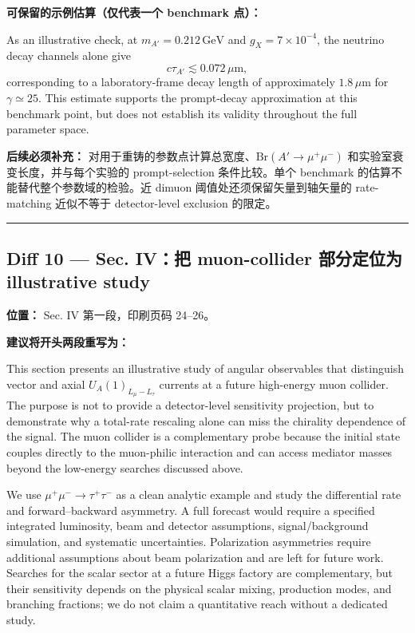 \documentclass[
]{article}
\begin{document}
\textbf{可保留的示例估算（仅代表一个 benchmark 点）：}

As an illustrative check, at \(m_{A'}=0.212\,\mathrm{GeV}\) and
\(g_X=7\times10^{-4}\), the neutrino decay channels alone give
\[
c\tau_{A'}\lesssim 0.072\,\mu\mathrm{m},
\]
corresponding to a laboratory-frame decay length of approximately
\(1.8\,\mu\mathrm{m}\) for \(\gamma\simeq25\). This estimate supports
the prompt-decay approximation at this benchmark point, but does not
establish its validity throughout the full parameter space.

\textbf{后续必须补充：}
对用于重铸的参数点计算总宽度、\(\mathrm{Br}(A'\to\mu^+\mu^-)\)
和实验室衰变长度，并与每个实验的 prompt-selection 条件比较。单个
benchmark 的估算不能替代整个参数域的检验。近 dimuon
阈值处还须保留矢量到轴矢量的 rate-matching 近似不等于 detector-level
exclusion 的限定。

\begin{center}\rule{0.5\linewidth}{0.5pt}\end{center}

\subsection{Diff 10 --- Sec. IV：把 muon-collider 部分定位为
illustrative
study}\label{diff-10-sec.-ivux628a-muon-collider-ux90e8ux5206ux5b9aux4f4dux4e3a-illustrative-study}

\textbf{位置：} Sec. IV 第一段，印刷页码 24--26。

\textbf{建议将开头两段重写为：}

This section presents an illustrative study of angular observables
that distinguish vector and axial \(U_A(1)_{L_\mu-L_\tau}\) currents
at a future high-energy muon collider. The purpose is not to provide
a detector-level sensitivity projection, but to demonstrate why a
total-rate rescaling alone can miss the chirality dependence of the
signal. The muon collider is a complementary probe because the
initial state couples directly to the muon-philic interaction and
can access mediator masses beyond the low-energy searches discussed
above.

We use \(\mu^+\mu^-\to\tau^+\tau^-\) as a clean analytic example and
study the differential rate and forward--backward asymmetry. A full
forecast would require a specified integrated luminosity, beam and
detector assumptions, signal/background simulation, and systematic
uncertainties. Polarization asymmetries require additional assumptions
about beam polarization and are left for future work. Searches for
the scalar sector at a future Higgs factory are complementary, but
their sensitivity depends on the physical scalar mixing, production
modes, and branching fractions; we do not claim a quantitative reach
without a dedicated study.
\end{document}
